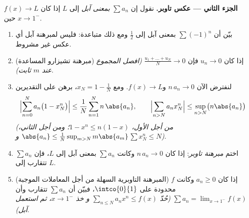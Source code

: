 \begin{problem}
\medskip
\noindent\textbf{الجزء الثاني --- عكس تاوبر.} نقول إن $\sum
a_n$ \emph{ بمعنى آبل} إلى $L$ إذا كان $f(x) \to L$ حين $x \to
1^-$.
\begin{enumerate}[resume]
  \item بيّن أن $\sum (-1)^n$  بمعنى آبل إلى $\frac12$
        ومع ذلك متباعدة: فليس لمبرهنة آبل أي عكس
        غير مشروط.
  \item (مبرهنة تشيزارو المساعدة) إذا كان $u_n \to 0$ فإن $\frac{u_1 + \dots
        + u_N}{N} \to 0$ \emph{(افصل المجموع عند $m$ ثابت)}.
  \item لنفترض الآن $n\,a_n \to 0$ و$f(x) \to L$. ومع $x_N =
        1 - \frac1N$، برهن على التقديرين
        \[
        \Bigl|\sum_{n=0}^{N} a_n\bigl(1 - x_N^n\bigr)\Bigr|
        \leq \frac{1}{N}\sum_{n=1}^{N} n\,\abs{a_n},
        \qquad
        \Bigl|\sum_{n>N} a_n x_N^n\Bigr|
        \leq \sup_{n>N}\bigl(n\abs{a_n}\bigr)
        \]
        \emph{(من أجل الأول، $1 - x^n \leq n(1-x)$؛ ومن أجل
        الثاني، $\abs{a_n} \leq \frac{1}{N}\sup_{m>N}
        m\abs{a_m}$ و$\sum x_N^n \leq N$)}.
  \item اختم \emph{مبرهنة تاوبر}: إذا كان $n\,a_n \to 0$ وكانت
        $\sum a_n$  بمعنى آبل إلى $L$، فإن $\sum a_n$
        تتقارب إلى $L$.
  \item (المبرهنة التاوبرية السهلة من أجل المعاملات الموجبة) إذا كان $a_n
        \geq 0$ وكانت $f$ محدودة على $\intco{0}{1}$، فبيّن أن
        $\sum a_n$ تتقارب وأن $\sum a_n = \lim_{x\to1^-}
        f(x)$ \emph{(حُدّ $\sum_{n\leq N}a_nx^n \leq f(x)$ و
        خذ $x \to 1^-$، ثم استعمل آبل)}.
\end{enumerate}


\end{problem}
